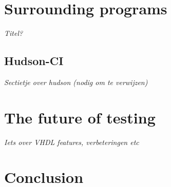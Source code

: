 \documentclass[11pt,british]{article}
\begin{document}

\section{Surrounding programs}
\emph{\color{red}Titel?}

\subsection{Hudson-CI}
\label{subsec:CI}\emph{\color{red}Sectietje over hudson (nodig om te verwijzen)}

\newpage{}
\section{The future of testing}
\emph{\color{red} Iets over VHDL features, verbeteringen etc}

\newpage{}
\section{Conclusion}

\pagebreak{}

\printbibliography

%
%
%
%
%
%
%
%
\end{document}
